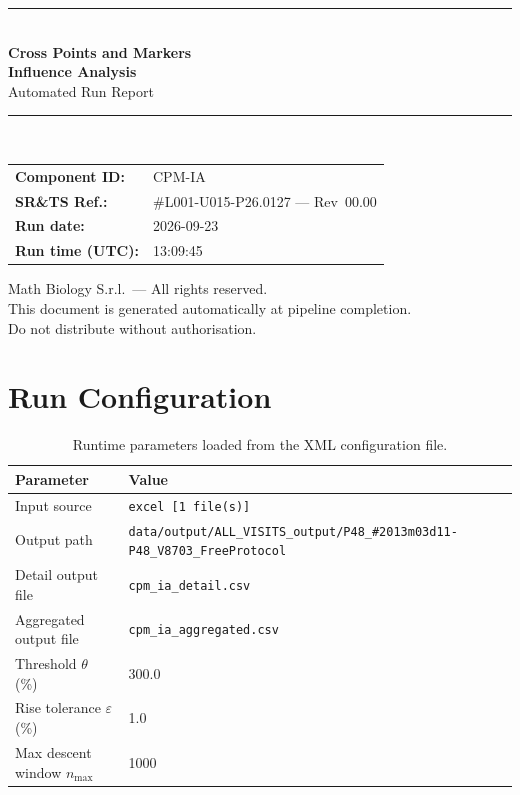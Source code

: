 \documentclass[a4paper,11pt]{article}
\begin{document}
\begin{titlepage}
\begin{center}
  \vspace*{1.8cm}
  {\color{dmaaccent}\rule{\linewidth}{1.5pt}}\\[0.6cm]
  {\LARGE\bfseries\color{dmaaccent}
    Cross Points and Markers\\[0.25cm]
    Influence Analysis}\\[0.4cm]
  {\Large Automated Run Report}\\[0.3cm]
  {\color{dmaaccent}\rule{\linewidth}{1.5pt}}\\[2cm]

  \begin{tabular}{ll}
    \textbf{Component ID:}   & CPM-IA \\[0.3cm]
    \textbf{SR\&TS Ref.:}    & \#L001-U015-P26.0127 --- Rev~00.00 \\[0.3cm]
    \textbf{Run date:}       & 2026-09-23 \\[0.3cm]
    \textbf{Run time (UTC):} & 13:09:45 \\
  \end{tabular}

  \vfill
  {\color{dmagray}\small
    Math Biology S.r.l.\ --- All rights reserved.\\
    This document is generated automatically at pipeline completion.\\
    Do not distribute without authorisation.}
\end{center}
\end{titlepage}

\tableofcontents
\clearpage

\section{Run Configuration}

\begin{table}[h!]
\centering
\small
\caption{Runtime parameters loaded from the XML configuration file.}
\begin{tabular}{ll}
\toprule
\textbf{Parameter} & \textbf{Value} \\
\midrule
Input source                      & \texttt{excel [1 file(s)]} \\
Output path                       & \texttt{data/output/ALL\_VISITS\_output/P48\_\#2013m03d11-P48\_V8703\_FreeProtocol} \\
Detail output file                & \texttt{cpm\_ia\_detail.csv} \\
Aggregated output file            & \texttt{cpm\_ia\_aggregated.csv} \\
Threshold $\theta$ (\%)           & 300.0 \\
Rise tolerance $\varepsilon$ (\%) & 1.0 \\
Max descent window $n_{\max}$     & 1000 \\
\bottomrule
\end{tabular}
\end{table}
\end{document}
